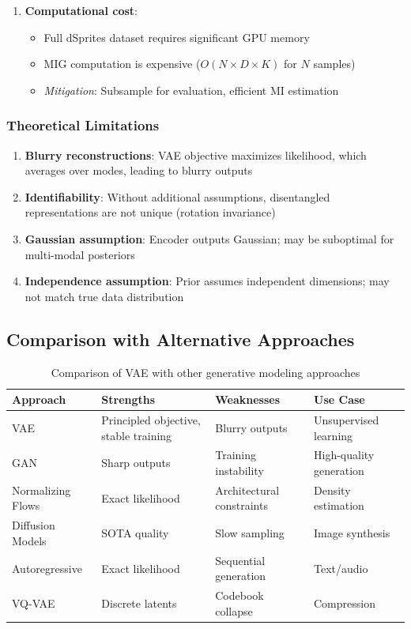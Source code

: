 \documentclass[conference]{IEEEtran}
\begin{document}
\begin{enumerate}
    \item \textbf{Computational cost}:
    \begin{itemize}
        \item Full dSprites dataset requires significant GPU memory
        \item MIG computation is expensive ($O(N \times D \times K)$ for $N$ samples)
        \item \textit{Mitigation}: Subsample for evaluation, efficient MI estimation
    \end{itemize}
\end{enumerate}

\subsubsection{Theoretical Limitations}

\begin{enumerate}
    \item \textbf{Blurry reconstructions}: VAE objective maximizes likelihood, which averages over modes, leading to blurry outputs
    
    \item \textbf{Identifiability}: Without additional assumptions, disentangled representations are not unique (rotation invariance)
    
    \item \textbf{Gaussian assumption}: Encoder outputs Gaussian; may be suboptimal for multi-modal posteriors
    
    \item \textbf{Independence assumption}: Prior assumes independent dimensions; may not match true data distribution
\end{enumerate}

\subsection{Comparison with Alternative Approaches}

\begin{table}[H]
\centering
\small
\begin{tabular}{@{}p{2.5cm}p{3cm}p{3cm}p{3.5cm}@{}}
\toprule
\textbf{Approach} & \textbf{Strengths} & \textbf{Weaknesses} & \textbf{Use Case} \\ \midrule
VAE & Principled objective, stable training & Blurry outputs & Unsupervised learning \\
GAN & Sharp outputs & Training instability & High-quality generation \\
Normalizing Flows & Exact likelihood & Architectural constraints & Density estimation \\
Diffusion Models & SOTA quality & Slow sampling & Image synthesis \\
Autoregressive & Exact likelihood & Sequential generation & Text/audio \\
VQ-VAE & Discrete latents & Codebook collapse & Compression \\ \bottomrule
\end{tabular}
\caption{Comparison of VAE with other generative modeling approaches}
\label{tab:generative_comparison}
\end{table}
\end{document}
